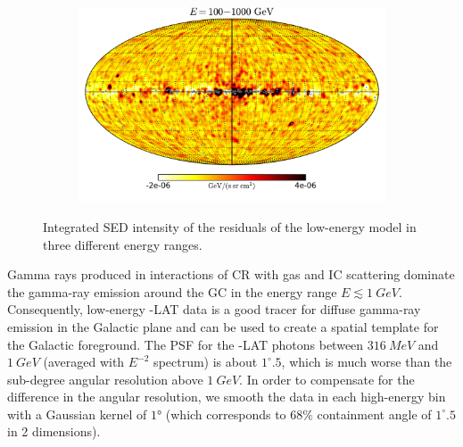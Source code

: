 \begin{figure}[t]
{\begin{subfigure}{0.3\textwidth}
        	\includegraphics[width=\textwidth]{plots/Mollweide_LowE_03-10GeV_flux_source_range_2.pdf}
    	\end{subfigure}
    }
  	\caption{Integrated SED intensity of the residuals of the low-energy model in three different energy ranges. }
  	\label{fig:Maps_lowE}
\end{figure}

Gamma rays produced in interactions of CR with gas and IC scattering dominate the gamma-ray emission around the GC in the energy range $E \lesssim \SI{1}{GeV}$. 
Consequently, low-energy \Fermi-LAT data is a good tracer for diffuse gamma-ray emission in the Galactic plane and can be used to create a spatial template for the Galactic foreground.
The PSF for the \Fermi-LAT photons between $\SI{316}{MeV}$ and $\SI{1}{GeV}$ (averaged with $E^{-2}$ spectrum) is about $1^\circ\!\!.5$,
which is much worse than the sub-degree angular resolution above $\SI{1}{GeV}$.
In order to compensate for the difference in the angular resolution, 
we smooth the data in each high-energy bin with a Gaussian kernel of $\ang{1}$ (which corresponds to $68\%$ containment angle of
$1^\circ\!\!.5$ in 2 dimensions).

